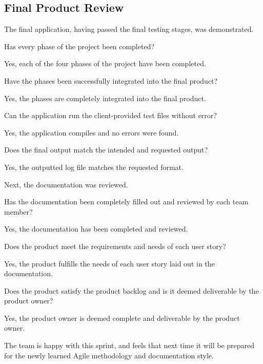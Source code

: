\subsection{Final Product Review}

The final application, having passed the final testing stages, was demonstrated.  \\
\begin{description}
\item [$\bullet$] Has every phase of the project been completed? 
\item Yes, each of the four phases of the project have been completed.
\item [$\bullet$]Have the phases been successfully integrated into the final product?
\item Yes, the phases are completely integrated into the final product.
\item [$\bullet$] Can the application run the client-provided test files without error?
\item Yes, the application compiles and no errors were found.
\item [$\bullet$] Does the final output match the intended and requested output?
\item Yes, the outputted log file matches the requested format.\\

\item Next, the documentation was reviewed. \\

\item [$\bullet$] Has the documentation been completely filled out and reviewed by each team member?
\item Yes, the documentation has been completed and reviewed. 
\item [$\bullet$] Does the product meet the requirements and needs of each user story?
\item Yes, the product fulfills the needs of each user story laid out in the documentation.
\item [$\bullet$] Does the product satisfy the product backlog and is it deemed deliverable by the product owner?
\item Yes, the product owner is deemed complete and deliverable by the product owner.\\

\item The team is happy with this sprint, and feels that next time it will be prepared for the newly learned Agile methodology and documentation style.\\
\end{description}

